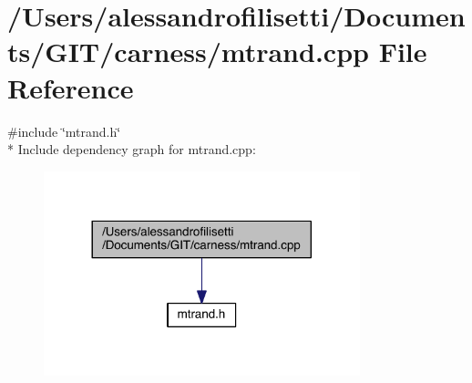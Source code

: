 \hypertarget{a00090}{\section{/\-Users/alessandrofilisetti/\-Documents/\-G\-I\-T/carness/mtrand.cpp File Reference}
\label{a00090}
}
{\ttfamily \#include \char`\"{}mtrand.\-h\char`\"{}}\\*
Include dependency graph for mtrand.\-cpp\-:\nopagebreak
\begin{figure}[H]
\begin{center}
\leavevmode
\includegraphics[width=260pt]{a00139}
\end{center}
\end{figure}
